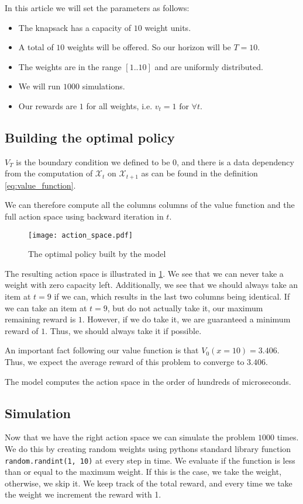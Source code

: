 \documentclass[nonacm,sigconf]{acmart}
\begin{document}
In this article we will set the parameters as follows:
\begin{itemize}
    \setlength\itemsep{0em}
    \item The knapsack has a capacity of $10$ weight units.
    \item A total of $10$ weights will be offered. So our horizon will be
        $T=10$.
    \item The weights are in the range $[1..10]$ and are uniformly distributed.
    \item We will run $1000$ simulations.
    \item Our rewards are $1$ for all weights, i.e. $ v_t = 1 \text{ for } \forall
        t $.
\end{itemize}

\subsection{Building the optimal policy}

$V_T$ is the boundary condition we defined to be $0$, and there is a data
dependency from the computation of $\mathcal{X}_t$ on $\mathcal{X}_{t+1}$ as
can be found in the definition \cref{eq:value_function}.

We can therefore compute all the columns columns of the value function and the full action space using backward iteration in $t$.

\begin{figure}[b]
    \texttt{[image: action\_space.pdf]}
    \caption{The optimal policy built by the model}
    \label{fig:action_space}
\end{figure}

The resulting action space is illustrated in \cref{fig:action_space}. We see
that we can never take a weight with zero capacity left. Additionally, we see
that we should always take an item at $t=9$ if we can, which results in the last
two columns being identical. If we can take an item at $t=9$, but do not
actually take it, our maximum remaining reward is $1$. However, if we do take
it, we are guaranteed a minimum reward of $1$. Thus, we should always take it if
possible.

An important fact following our value function is that $V_0(x=10) = 3.406$.
Thus, we expect the average reward of this problem to converge to $3.406$.

The model computes the action space in the order of hundreds of microseconds.

\subsection{Simulation}
Now that we have the right action space we can simulate the problem $1000$ times.
We do this by creating random weights using pythons standard library function
\lstinline{random.randint(1, 10)} at every step in time. We evaluate if the
function is less than or equal to the maximum weight. If this is the case, we take the
weight, otherwise, we skip it. We keep track of the total reward, and every
time we take the weight we increment the reward with 1.
\end{document}
